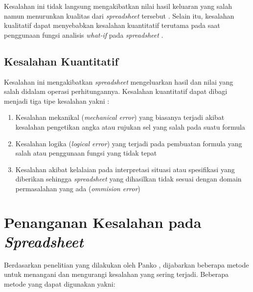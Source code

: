     Kesalahan ini tidak langsung mengakibatkan nilai hasil keluaran yang salah namun menurunkan kualitas dari \textit{spreadsheet} tersebut \parencite{Rajalingham2001}. Selain itu, kesalahan kualitatif dapat menyebabkan kesalahan kuantitatif terutama pada saat penggunaan fungsi analisis \textit{what-if} pada \textit{spreadsheet} \parencite{Panko1998}.

    \subsection{Kesalahan Kuantitatif}
    Kesalahan ini mengakibatkan \textit{spreadsheet} mengeluarkan hasil dan nilai yang salah didalam operasi perhitungannya. Kesalahan kuantitatif dapat dibagi menjadi tiga tipe kesalahan yakni \parencite{Panko1998}:

    \begin{enumerate}
        \item Kesalahan mekanikal (\textit{mechanical error}) yang biasanya terjadi akibat kesalahan pengetikan angka atau rujukan sel yang salah pada suatu formula
        \item Kesalahan logika (\textit{logical error}) yang terjadi pada pembuatan formula yang salah atau penggunaan fungsi yang tidak tepat
        \item Kesalahan akibat kelalaian pada interpretasi situasi atau spesifikasi yang diberikan sehingga \textit{spreadsheet} yang dihasilkan tidak sesuai dengan domain permasalahan yang ada \parencite{Powell2009} (\textit{ommision error})
    \end{enumerate}

\section{Penanganan Kesalahan pada \textit{Spreadsheet}}
Berdasarkan penelitian yang dilakukan oleh Panko \parencite{Panko1998}, dijabarkan beberapa metode untuk menangani dan mengurangi kesalahan yang sering terjadi. Beberapa metode yang dapat digunakan yakni:

